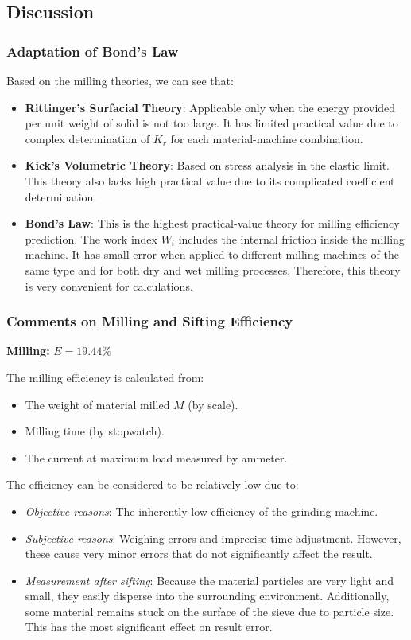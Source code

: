 \subsection{Discussion}

\subsubsection{Adaptation of Bond's Law}

Based on the milling theories, we can see that:

\begin{itemize}
    \item \textbf{Rittinger's Surfacial Theory}: Applicable only when the energy provided per unit weight of solid is not too large. It has limited practical value due to complex determination of $K_r$ for each material-machine combination.
    \item \textbf{Kick's Volumetric Theory}: Based on stress analysis in the elastic limit. This theory also lacks high practical value due to its complicated coefficient determination.
    \item \textbf{Bond's Law}: This is the highest practical-value theory for milling efficiency prediction. The work index $W_i$ includes the internal friction inside the milling machine. It has small error when applied to different milling machines of the same type and for both dry and wet milling processes. Therefore, this theory is very convenient for calculations.
\end{itemize}

\subsubsection{Comments on Milling and Sifting Efficiency}

\textbf{Milling:} $E = 19.44\%$

The milling efficiency is calculated from:
\begin{itemize}
    \item The weight of material milled $M$ (by scale).
    \item Milling time (by stopwatch).
    \item The current at maximum load measured by ammeter.
\end{itemize}

The efficiency can be considered to be relatively low due to:
\begin{itemize}
    \item \textit{Objective reasons}: The inherently low efficiency of the grinding machine.
    \item \textit{Subjective reasons}: Weighing errors and imprecise time adjustment. However, these cause very minor errors that do not significantly affect the result.
    \item \textit{Measurement after sifting}: Because the material particles are very light and small, they easily disperse into the surrounding environment. Additionally, some material remains stuck on the surface of the sieve due to particle size. This has the most significant effect on result error.
\end{itemize}

